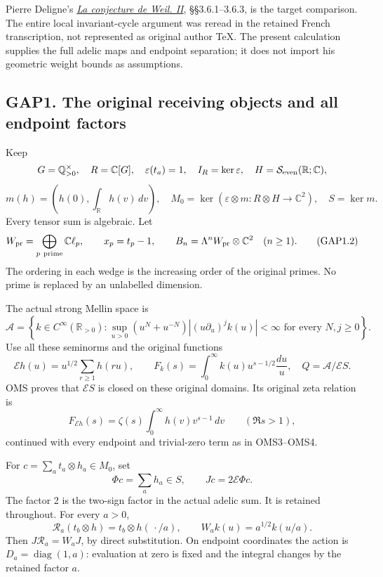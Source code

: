 Pierre Deligne's
\href{https://www.numdam.org/item/PMIHES_1980__52__137_0/}{\emph{La
conjecture de Weil. II}}, §§3.6.1--3.6.3, is the target comparison. The
entire local invariant-cycle argument was reread in the retained French
transcription, not represented as original author TeX. The present
calculation supplies the full adelic maps and endpoint separation; it
does not import his geometric weight bounds as assumptions.

\subsection{GAP1. The original receiving objects and all endpoint
factors}\label{gap1.-the-original-receiving-objects-and-all-endpoint-factors}

Keep \[
G=\mathbb Q_{>0}^{\times},\quad R=\mathbb C[G],\quad
\varepsilon(t_a)=1,\quad I_R=\ker\varepsilon,
\quad H=\mathcal S_{\rm even}(\mathbb R;\mathbb C),
\] \[
m(h)=\left(h(0),\int_{\mathbb R}h(v)\,dv\right),\quad
M_0=\ker(\varepsilon\otimes m:R\otimes H\to\mathbb C^2),
\quad S=\ker m.
\tag{GAP1.1}
\] Every tensor sum is algebraic. Let \[
W_{\rm pr}=\bigoplus_{p\ {\rm prime}}\mathbb C\ell_p,
\qquad x_p=t_p-1,
\qquad B_n=\Lambda^n W_{\rm pr}\otimes\mathbb C^2\quad(n\ge1).
\tag{GAP1.2}
\] The ordering in each wedge is the increasing order of the original
primes. No prime is replaced by an unlabelled dimension.

The actual strong Mellin space is \[
\mathcal A=\left\{k\in C^\infty(\mathbb R_{>0}):
\sup_{u>0}(u^N+u^{-N})|(u\partial_u)^jk(u)|<\infty
\text{ for every }N,j\ge0\right\}.
\] Use all these seminorms and the original functions \[
\mathcal E h(u)=u^{1/2}\sum_{r\ge1}h(ru),\qquad
F_k(s)=\int_0^\infty k(u)u^{s-1/2}\frac{du}{u},
\quad Q=\mathcal A/\mathcal ES.
\tag{GAP1.3}
\] OMS proves that \(\mathcal ES\) is closed on these original domains.
Its original zeta relation is \[
F_{\mathcal Eh}(s)=\zeta(s)\int_0^\infty h(v)v^{s-1}\,dv
\qquad(\Re s>1),
\tag{GAP1.4}
\] continued with every endpoint and trivial-zero term as in OMS3--OMS4.

For \(c=\sum_a t_a\otimes h_a\in M_0\), set \[
\Phi c=\sum_a h_a\in S,\qquad
Jc=2\mathcal E\Phi c.
\tag{GAP1.5}
\] The factor 2 is the two-sign factor in the actual adelic sum. It is
retained throughout. For every \(a>0\), \[
\mathscr R_a(t_b\otimes h)=t_b\otimes h(\,\cdot/a),
\qquad W_a k(u)=a^{1/2}k(u/a).
\tag{GAP1.6}
\] Then \(J\mathscr R_a=W_aJ\), by direct substitution. On endpoint
coordinates the action is \(D_a=\operatorname{diag}(1,a)\): evaluation
at zero is fixed and the integral changes by the retained factor \(a\).

